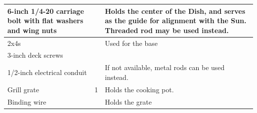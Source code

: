 \documentclass{article}
\begin{document}
\begin{table}[h]
\begin{tabular}{|p{3cm}|p{3cm}|p{11cm}|}
                6-inch 1/4-20 carriage bolt with flat washers and wing nuts &                       & Holds the center of the Dish, and serves as the guide for alignment with the Sun.  Threaded rod may be used instead. \\ \hline
                2x4s                                                        &                       & Used for the base                                                                                                    \\ \hline
                3-inch deck screws                                          &                       &                                                                                                                      \\ \hline
                1/2-inch electrical conduit                                 &                       & If not available, metal rods can be used instead.                                                                    \\ \hline
                Grill grate                                                 & 1                     & Holds the cooking pot.                                                                                               \\ \hline
                Binding wire                                                &                       & Holds the grate                                                                                                      \\ \hline
                \end{tabular}
            \end{table}
        \newpage
\end{document}
